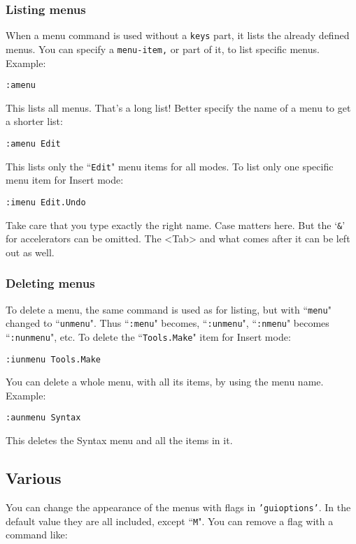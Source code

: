 \subsubsection{Listing menus}
When a menu command is used without a \texttt{{keys}} part, it lists the already defined menus.
You can specify a \texttt{{menu-item},} or part of it, to list specific menus.
Example:

\begin{Verbatim}[samepage=true]
 :amenu
\end{Verbatim}

This lists all menus.
That's a long list!  Better specify the name of a menu to get a shorter list:

\begin{Verbatim}[samepage=true]
 :amenu Edit
\end{Verbatim}

This lists only the ``\texttt{Edit}" menu items for all modes.
To list only one specific menu item for Insert mode:

\begin{Verbatim}[samepage=true]
 :imenu Edit.Undo
\end{Verbatim}

Take care that you type exactly the right name.
Case matters here.
But the `\texttt{\&}' for accelerators can be omitted.
The <Tab> and what comes after it can be left out as well.

\subsubsection{Deleting menus}
To delete a menu, the same command is used as for listing, but with ``\texttt{menu}" changed to ``\texttt{unmenu}".
Thus ``\texttt{:menu}" becomes, ``\texttt{:unmenu}", ``\texttt{:nmenu}" becomes ``\texttt{:nunmenu}", etc.
To delete the ``\texttt{Tools.Make}" item for Insert mode:

\begin{Verbatim}[samepage=true]
 :iunmenu Tools.Make
\end{Verbatim}

You can delete a whole menu, with all its items, by using the menu name.
Example:

\begin{Verbatim}[samepage=true]
 :aunmenu Syntax
\end{Verbatim}

This deletes the Syntax menu and all the items in it.
\subsection{Various}
You can change the appearance of the menus with flags in \texttt{'guioptions'}.
In the default value they are all included, except ``\texttt{M}".
You can remove a flag with a command like:

